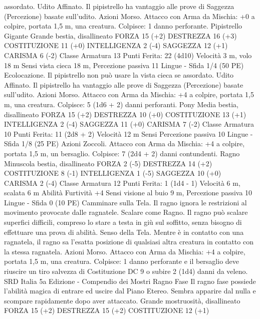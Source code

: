 \begin{multicols}{2}
assordato.
Udito Affinato. Il pipistrello ha vantaggio alle prove di Saggezza
(Percezione) basate sull’udito.
Azioni
Morso. Attacco con Arma da Mischia: +0 a colpire, portata 1,5
m, una creatura.
Colpisce: 1 danno perforante.
Pipistrello Gigante
Grande bestia, disallineato
FORZA 15 (+2)
DESTREZZA 16 (+3)
COSTITUZIONE 11 (+0)
INTELLIGENZA 2 (-4)
SAGGEZZA 12 (+1)
CARISMA 6 (-2)
Classe Armatura 13
\hspace*{0pt}\hfill{Punti Ferita}: 22 (4d10)
Velocità 3 m, volo 18 m
Sensi vista cieca 18 m, Percezione passiva 11
Lingue -
Sfida 1/4 (50 PE)
Ecolocazione. Il pipistrello non può usare la vista cieca se
assordato.
Udito Affinato. Il pipistrello ha vantaggio alle prove di Saggezza
(Percezione) basate sull’udito.
Azioni
Morso. Attacco con Arma da Mischia: +4 a colpire, portata 1,5
m, una creatura.
Colpisce: 5 (1d6 + 2) danni perforanti.
Pony
Media bestia, disallineato
FORZA 15 (+2)
DESTREZZA 10 (+0)
COSTITUZIONE 13 (+1)
INTELLIGENZA 2 (-4)
SAGGEZZA 11 (+0)
CARISMA 7 (-2)
Classe Armatura 10
\hspace*{0pt}\hfill{Punti Ferita}: 11 (2d8 + 2)
Velocità 12 m
Sensi Percezione passiva 10
Lingue -
Sfida 1/8 (25 PE)
Azioni
Zoccoli. Attacco con Arma da Mischia: +4 a colpire, portata 1,5
m, un bersaglio.
Colpisce: 7 (2d4 + 2) danni contundenti.
Ragno
Minuscola bestia, disallineato
FORZA 2 (-5)
DESTREZZA 14 (+2)
COSTITUZIONE 8 (-1)
INTELLIGENZA 1 (-5)
SAGGEZZA 10 (+0)
CARISMA 2 (-4)
Classe Armatura 12
\hspace*{0pt}\hfill{Punti Ferita}: 1 (1d4 - 1)
Velocità 6 m, scalata 6 m
Abilità Furtività +4
Sensi visione al buio 9 m, Percezione passiva 10
Lingue -
Sfida 0 (10 PE)
Camminare sulla Tela. Il ragno ignora le restrizioni al
movimento provocate dalle ragnatele.
Scalare come Ragno. Il ragno può scalare superfici difficili,
compreso lo stare a testa in giù sul soffitto, senza bisogno di
effettuare una prova di abilità.
Senso della Tela. Mentre è in contatto con una ragnatela, il
ragno sa l’esatta posizione di qualsiasi altra creatura in contatto
con la stessa ragnatela.
Azioni
Morso. Attacco con Arma da Mischia: +4 a colpire, portata 1,5
m, una creatura.
Colpisce: 1 danno perforante e il bersaglio deve riuscire un tiro
salvezza di Costituzione DC 9 o subire 2 (1d4) danni da veleno.
SRD Italia 5a Edizione - Compendio dei Mostri
Ragno Fase
Il ragno fase possiede l’abilità magica di entrare ed
uscire dal Piano Etereo. Sembra apparire dal nulla e
scompare rapidamente dopo aver attaccato.
Grande mostruosità, disallineato
FORZA 15 (+2)
DESTREZZA 15 (+2)
COSTITUZIONE 12 (+1)

\end{multicols}
